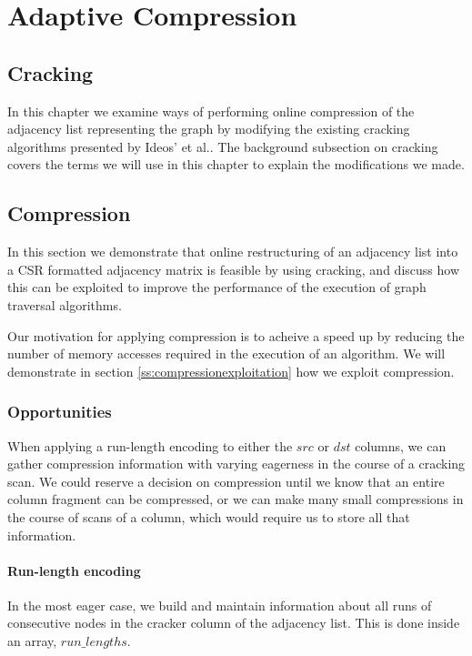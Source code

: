 \chapter{Adaptive Compression}

\label{ch:adaptivecompression}

\section{Cracking}

In this chapter we examine ways of performing online compression of the adjacency list representing
the graph by modifying the existing cracking algorithms presented by Ideos' et al.. The background
subsection on cracking covers the terms we will use in this chapter to explain the modifications we
made.

\section{Compression}

In this section we demonstrate that online restructuring of an adjacency list into a CSR formatted 
adjacency matrix is feasible by using cracking, and discuss how this can be exploited to improve the
performance of the execution of graph traversal algorithms.

Our motivation for applying compression is to acheive a speed up by reducing the number of memory
accesses required in the execution of an algorithm. We will demonstrate in section
\ref{ss:compressionexploitation} how we exploit compression.

\subsection{Opportunities}

When applying a run-length encoding to either the $src$ or $dst$ columns, we can gather compression
information with varying eagerness in the course of a cracking scan. We could reserve a decision on
compression until we know that an entire column fragment can be compressed, or we can make many small
compressions in the course of scans of a column, which would require us to store all that
information.

\subsubsection{Run-length encoding}

In the most eager case, we build and maintain information about all runs of consecutive nodes in the
cracker column of the adjacency list. This is done inside an array, $run\_lengths$.


